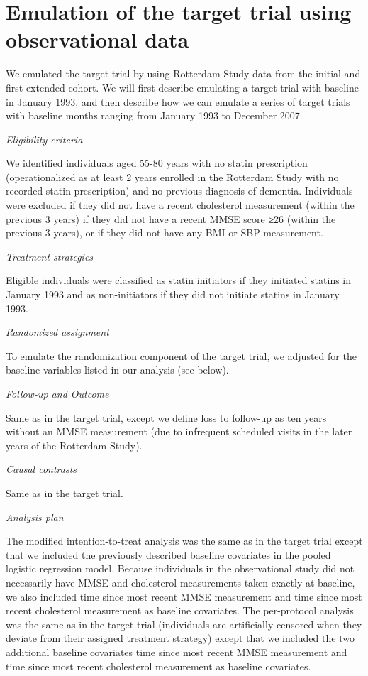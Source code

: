 \documentclass[
]{book}
\begin{document}
\hypertarget{emulation-of-the-target-trial-using-observational-data}{%
\section{Emulation of the target trial using observational data}\label{emulation-of-the-target-trial-using-observational-data}}

We emulated the target trial by using Rotterdam Study data from the initial and first extended cohort. We will first describe emulating a target trial with baseline in January 1993, and then describe how we can emulate a series of target trials with baseline months ranging from January 1993 to December 2007.

\emph{Eligibility criteria}

We identified individuals aged 55-80 years with no statin prescription (operationalized as at least 2 years enrolled in the Rotterdam Study with no recorded statin prescription) and no previous diagnosis of dementia. Individuals were excluded if they did not have a recent cholesterol measurement (within the previous 3 years) if they did not have a recent MMSE score ≥26 (within the previous 3 years), or if they did not have any BMI or SBP measurement.

\emph{Treatment strategies}

Eligible individuals were classified as statin initiators if they initiated statins in January 1993 and as non-initiators if they did not initiate statins in January 1993.

\emph{Randomized assignment}

To emulate the randomization component of the target trial, we adjusted for the baseline variables listed in our analysis (see below).

\emph{Follow-up and Outcome}

Same as in the target trial, except we define loss to follow-up as ten years without an MMSE measurement (due to infrequent scheduled visits in the later years of the Rotterdam Study).

\emph{Causal contrasts}

Same as in the target trial.

\emph{Analysis plan}

The modified intention-to-treat analysis was the same as in the target trial except that we included the previously described baseline covariates in the pooled logistic regression model. Because individuals in the observational study did not necessarily have MMSE and cholesterol measurements taken exactly at baseline, we also included time since most recent MMSE measurement and time since most recent cholesterol measurement as baseline covariates. The per-protocol analysis was the same as in the target trial (individuals are artificially censored when they deviate from their assigned treatment strategy) except that we included the two additional baseline covariates time since most recent MMSE measurement and time since most recent cholesterol measurement as baseline covariates.
\end{document}
